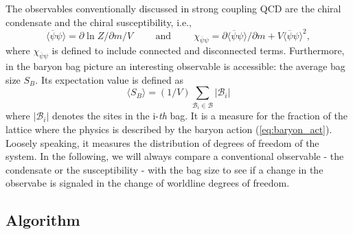 \documentclass{PoS}
\begin{document}
The observables conventionally discussed in strong coupling QCD are the chiral condensate and the chiral susceptibility, i.e.,
\begin{equation}
\langle \overline{\psi}\psi \rangle = \partial \ln Z/\partial m / V \hspace{1cm} \text{and} \hspace{1cm} \chi_{\overline{\psi}\psi} = \partial \langle\overline{\psi}\psi\rangle/\partial m + V\langle \overline{\psi}\psi \rangle^2,
\end{equation}
where $ \chi_{\overline{\psi}\psi}$ is defined to include connected and disconnected terms. Furthermore, in the baryon bag picture an interesting observable is accessible: the average bag size $S_B$. Its expectation value is defined as
\begin{equation}
\langle S_B \rangle = (1/V) \sum_{\mathcal{B}_i \in \mathcal{B}} |\mathcal{B}_i|
\end{equation}
where $|\mathcal{B}_i|$ denotes the sites in the i-\textit{th} bag. It is a measure for the fraction of the lattice where the physics is described by the baryon action (\ref{eq:baryon_act}). Loosely speaking, it measures the distribution of degrees of freedom of the system. In the following, we will always compare a conventional observable - the condensate or the susceptibility - with the bag size to see if a change in the observabe is signaled in the change of worldline degrees of freedom.
\subsection{Algorithm}
\end{document}
